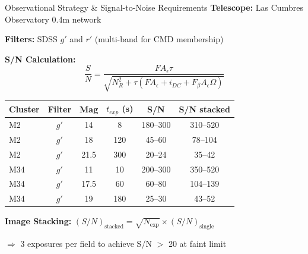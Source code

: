 \documentclass{beamer}
\begin{document}

\begin{frame}{Observational Strategy \& Signal-to-Noise Requirements}
    \textbf{Telescope:} Las Cumbres Observatory 0.4m network

    \textbf{Filters:} SDSS $g'$ and $r'$ (multi-band for CMD membership)

    \vspace{0.3cm}

    \textbf{S/N Calculation:}
    $$\frac{S}{N} = \frac{F A_\epsilon \tau}{\sqrt{N_R^2 + \tau (F A_\epsilon + i_{DC} + F_\beta A_\epsilon \Omega)}}$$

    \vspace{0.3cm}

    \begin{table}
        \centering
        \scriptsize
        \begin{tabular}{l c c c c c}
            \toprule
            \textbf{Cluster} & \textbf{Filter} & \textbf{Mag} & \textbf{$t_{exp}$ (s)} & \textbf{S/N} & \textbf{S/N stacked} \\
            \midrule
            M2 & $g'$ & 14 & 8 & 180--300 & 310--520 \\
            M2 & $g'$ & 18 & 120 & 45--60 & 78--104 \\
            M2 & $g'$ & 21.5 & 300 & 20--24 & 35--42 \\
            \midrule
            M34 & $g'$ & 11 & 10 & 200--300 & 350--520 \\
            M34 & $g'$ & 17.5 & 60 & 60--80 & 104--139 \\
            M34 & $g'$ & 19 & 180 & 25--30 & 43--52 \\
            \bottomrule
        \end{tabular}
    \end{table}

    \vspace{0.2cm}

    \textbf{Image Stacking:} $(S/N)_{\text{stacked}} = \sqrt{N_{\text{exp}}} \times (S/N)_{\text{single}}$

    $\Rightarrow$ 3 exposures per field to achieve S/N $>$ 20 at faint limit
\end{frame}

\end{document}
